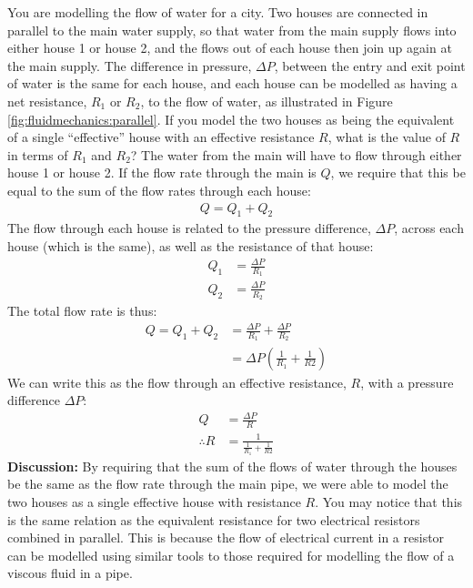 {{\begin{example}{
You are modelling the flow of water for a city. Two houses are connected in parallel to the main water supply, so that water from the main supply flows into either house 1 or house 2, and the flows out of each house then join up again at the main supply. The difference in pressure, $\Delta P$, between the entry and exit point of water is the same for each house, and each house can be modelled as having a net resistance, $R_{1}$ or $R_2$, to the flow of water, as illustrated in Figure \ref{fig:fluidmechanics:parallel}. If you model the two houses as being the equivalent of a single ``effective'' house with an effective resistance $R$, what is the value of $R$ in terms of $R_1$ and $R_2$?}
The water from the main will have to flow through either house 1 or house 2. If the flow rate through the main is $Q$, we require that this be equal to the sum of the flow rates through each house:
\begin{align*}
Q = Q_1 + Q_2
\end{align*}
The flow through each house is related to the pressure difference, $\Delta P$, across each house (which is the same), as well as the resistance of that house:
\begin{align*}
Q_1 &= \frac{\Delta P}{R_1}\\
Q_2 &= \frac{\Delta P}{R_2}
\end{align*}
The total flow rate is thus:
\begin{align*}
Q = Q_1 + Q_2&=\frac{\Delta P}{R_1}+\frac{\Delta P}{R_2}\\
&=\Delta P \left(\frac{1}{R_1}+\frac{1}{R2}\right)
\end{align*}
We can write this as the flow through an effective resistance, $R$, with a pressure difference $\Delta P$:
\begin{align*}
Q &= \frac{\Delta P}{R}\\
\therefore R&= \frac{1}{\frac{1}{R_1}+\frac{1}{R2}}
\end{align*}
\textbf{Discussion: }By requiring that the sum of the flows of water through the houses be the same as the flow rate through the main pipe, we were able to model the two houses as a single effective house with resistance $R$. You may notice that this is the same relation as the equivalent resistance for two electrical resistors combined in parallel. This is because the flow of electrical current in a resistor can be modelled using similar tools to those required for modelling the flow of a viscous fluid in a pipe. 
\end{example}


}}
